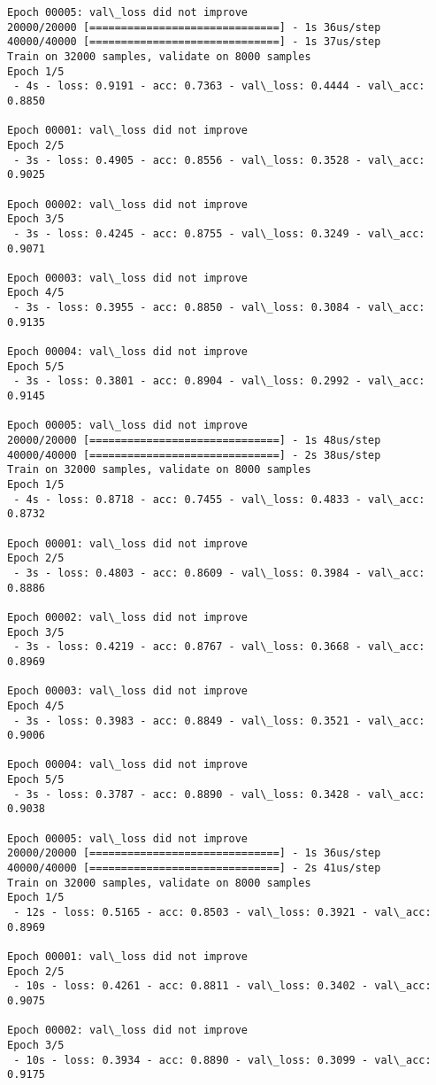 \documentclass[11pt]{article}
\begin{document}
\begin{Verbatim}[commandchars=\\\{\}]
Epoch 00005: val\_loss did not improve
20000/20000 [==============================] - 1s 36us/step
40000/40000 [==============================] - 1s 37us/step
Train on 32000 samples, validate on 8000 samples
Epoch 1/5
 - 4s - loss: 0.9191 - acc: 0.7363 - val\_loss: 0.4444 - val\_acc: 0.8850

Epoch 00001: val\_loss did not improve
Epoch 2/5
 - 3s - loss: 0.4905 - acc: 0.8556 - val\_loss: 0.3528 - val\_acc: 0.9025

Epoch 00002: val\_loss did not improve
Epoch 3/5
 - 3s - loss: 0.4245 - acc: 0.8755 - val\_loss: 0.3249 - val\_acc: 0.9071

Epoch 00003: val\_loss did not improve
Epoch 4/5
 - 3s - loss: 0.3955 - acc: 0.8850 - val\_loss: 0.3084 - val\_acc: 0.9135

Epoch 00004: val\_loss did not improve
Epoch 5/5
 - 3s - loss: 0.3801 - acc: 0.8904 - val\_loss: 0.2992 - val\_acc: 0.9145

Epoch 00005: val\_loss did not improve
20000/20000 [==============================] - 1s 48us/step
40000/40000 [==============================] - 2s 38us/step
Train on 32000 samples, validate on 8000 samples
Epoch 1/5
 - 4s - loss: 0.8718 - acc: 0.7455 - val\_loss: 0.4833 - val\_acc: 0.8732

Epoch 00001: val\_loss did not improve
Epoch 2/5
 - 3s - loss: 0.4803 - acc: 0.8609 - val\_loss: 0.3984 - val\_acc: 0.8886

Epoch 00002: val\_loss did not improve
Epoch 3/5
 - 3s - loss: 0.4219 - acc: 0.8767 - val\_loss: 0.3668 - val\_acc: 0.8969

Epoch 00003: val\_loss did not improve
Epoch 4/5
 - 3s - loss: 0.3983 - acc: 0.8849 - val\_loss: 0.3521 - val\_acc: 0.9006

Epoch 00004: val\_loss did not improve
Epoch 5/5
 - 3s - loss: 0.3787 - acc: 0.8890 - val\_loss: 0.3428 - val\_acc: 0.9038

Epoch 00005: val\_loss did not improve
20000/20000 [==============================] - 1s 36us/step
40000/40000 [==============================] - 2s 41us/step
Train on 32000 samples, validate on 8000 samples
Epoch 1/5
 - 12s - loss: 0.5165 - acc: 0.8503 - val\_loss: 0.3921 - val\_acc: 0.8969

Epoch 00001: val\_loss did not improve
Epoch 2/5
 - 10s - loss: 0.4261 - acc: 0.8811 - val\_loss: 0.3402 - val\_acc: 0.9075

Epoch 00002: val\_loss did not improve
Epoch 3/5
 - 10s - loss: 0.3934 - acc: 0.8890 - val\_loss: 0.3099 - val\_acc: 0.9175


\end{Verbatim}
\end{document}

